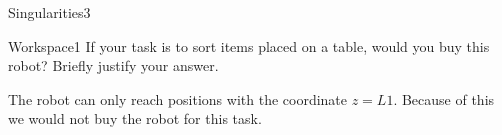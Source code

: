 \begin{questions}
\begin{question}{Singularities}{3}
\begin{answer}
	\end{answer}

\end{question}


\begin{question}{Workspace}{1}
If your task is to sort items placed on a table, would you buy this robot? Briefly justify your answer.

\begin{answer}
	The robot can only reach positions with the coordinate $z=L1$. Because of this we would not buy the robot for this task.
\end{answer}

\end{question}

\end{questions}
